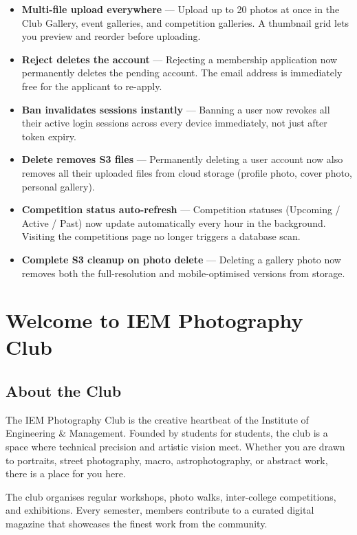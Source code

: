 \documentclass[12pt,a4paper]{article}
\begin{document}
\begin{itemize}
  \item \textbf{Multi-file upload everywhere} --- Upload up to 20 photos at once in the Club Gallery, event galleries, and competition galleries. A thumbnail grid lets you preview and reorder before uploading.
  \item \textbf{Reject deletes the account} --- Rejecting a membership application now permanently deletes the pending account. The email address is immediately free for the applicant to re-apply.
  \item \textbf{Ban invalidates sessions instantly} --- Banning a user now revokes all their active login sessions across every device immediately, not just after token expiry.
  \item \textbf{Delete removes S3 files} --- Permanently deleting a user account now also removes all their uploaded files from cloud storage (profile photo, cover photo, personal gallery).
  \item \textbf{Competition status auto-refresh} --- Competition statuses (Upcoming / Active / Past) now update automatically every hour in the background. Visiting the competitions page no longer triggers a database scan.
  \item \textbf{Complete S3 cleanup on photo delete} --- Deleting a gallery photo now removes both the full-resolution and mobile-optimised versions from storage.
\end{itemize}

\section{Welcome to IEM Photography Club}

\subsection{About the Club}

The IEM Photography Club is the creative heartbeat of the Institute of Engineering \& Management. Founded by students for students, the club is a space where technical precision and artistic vision meet. Whether you are drawn to portraits, street photography, macro, astrophotography, or abstract work, there is a place for you here.

The club organises regular workshops, photo walks, inter-college competitions, and exhibitions. Every semester, members contribute to a curated digital magazine that showcases the finest work from the community.
\end{document}

